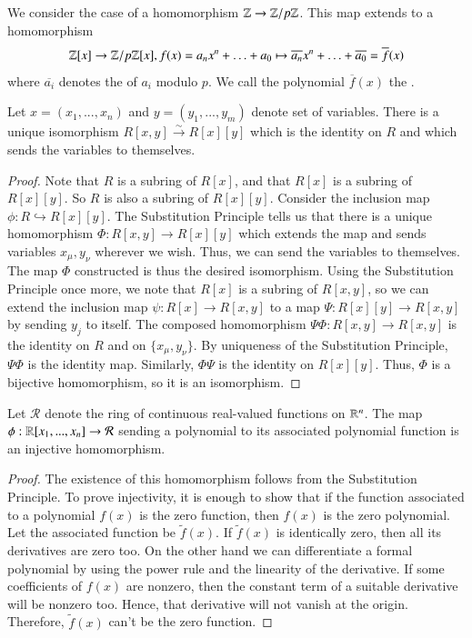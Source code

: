 \documentclass[12pt, a4paper, oneside, openright, titlepage]{book}
\begin{document}
\begin{eg}
        We consider the case of a homomorphism $\mathbb Z \rightarrow \mathbb Z/p\mathbb Z$. This map extends to a homomorphism \begin{equation}
                \mathbb Z[x] \rightarrow \mathbb Z/p\mathbb Z[x], f(x) = a_nx^n+\hdots + a_0 \mapsto \overline{a_n}x^n+\hdots + \overline{a_0} = \overline{f}(x)
        \end{equation}
        where $\overline{a_i}$ denotes the  of $a_i$ modulo $p$. We call the polynomial $\overline{f}(x)$ the .
\end{eg}


\begin{cor}
        Let $x = (x_1,...,x_n)$ and $y = (y_1,...,y_m)$ denote set of variables. There is a unique isomorphism $R[x,y] \xrightarrow{\sim}R[x][y]$ which is the identity on $R$ and which sends the variables to themselves.
\end{cor}
\begin{proof}
        Note that $R$ is a subring of $R[x]$, and that $R[x]$ is a subring of $R[x][y]$. So $R$ is also a subring of $R[x][y]$. Consider the inclusion map $\phi:R\hookrightarrow R[x][y]$. The Substitution Principle tells us that there is a unique homomorphism $\Phi:R[x,y] \rightarrow R[x][y]$ which extends the map and sends variables $x_{\mu},y_{\nu}$ wherever we wish. Thus, we can send the variables to themselves. The map $\Phi$ constructed is thus the desired isomorphism. Using the Substitution Principle once more, we note that $R[x]$ is a subring of $R[x,y]$, so we can extend the inclusion map $\psi:R[x] \rightarrow R[x,y]$ to a map $\Psi:R[x][y] \rightarrow R[x,y]$ by sending $y_j$ to itself. The composed homomorphism $\Psi\Phi: R[x,y] \rightarrow R[x,y]$ is the identity on $R$ and on $\{x_{\mu},y_{\nu}\}$. By uniqueness of the Substitution Principle, $\Psi\Phi$ is the identity map. Similarly, $\Phi\Psi$ is the identity on $R[x][y]$. Thus, $\Phi$ is a bijective homomorphism, so it is an isomorphism.
\end{proof}


\begin{prop}
        Let $\mathcal{R}$ denote the ring of continuous real-valued functions on $\mathbb R^n$. The map $\phi:\mathbb R[x_1,...,x_n]\rightarrow \mathcal{R}$ sending a polynomial to its associated polynomial function is an injective homomorphism.
\end{prop}
\begin{proof}
        The existence of this homomorphism follows from the Substitution Principle. To prove injectivity, it is enough to show that if the function associated to a polynomial $f(x)$ is the zero function, then $f(x)$ is the zero polynomial. Let the associated function be $\widetilde{f}(x)$. If $\widetilde{f}(x)$ is identically zero, then all its derivatives are zero too. On the other hand we can differentiate a formal polynomial by using the power rule and the linearity of the derivative. If some coefficients of $f(x)$ are nonzero, then the constant term of a suitable derivative will be nonzero too. Hence, that derivative will not vanish at the origin. Therefore, $\widetilde{f}(x)$ can't be the zero function.
\end{proof}
\end{document}
